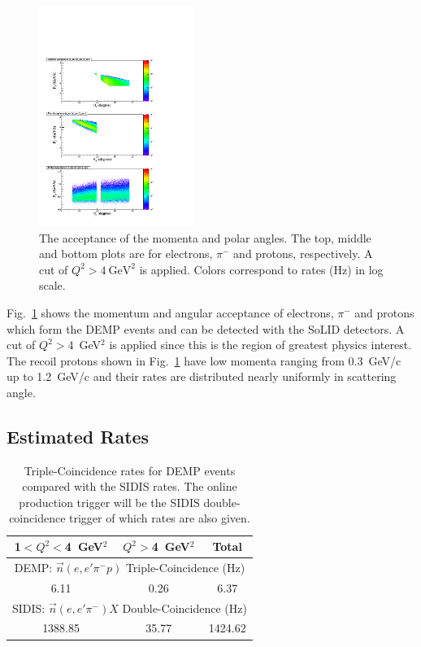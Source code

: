 \begin{figure}[!ht]
 \begin{center}
   \includegraphics[type=pdf,
     ext=.pdf,read=.pdf,width=0.45\textwidth]{./figures/E11_acc_epip_Q2gt4}
   \caption[The acceptance of the momenta and scattering angles for electrons,
    $\pi^{-}$ and protons]{\footnotesize{The acceptance of the momenta and
    polar angles. The top, middle and
    bottom plots are for electrons, $\pi^{-}$ and protons, respectively. A
    cut of $Q^{2}>4~\mathrm{GeV^{2}}$ is applied. Colors correspond to rates
    (Hz) in log scale.}}
  \label{p_theta}
  \end{center}
\end{figure}

Fig.~\ref{p_theta} shows the momentum and angular acceptance of electrons,
$\pi^{-}$ and protons which form the DEMP events and can be detected with the
SoLID detectors.  A cut of $Q^2>$4~GeV$^2$ is applied since this is the region of greatest physics interest.  The recoil
protons shown in Fig.~\ref{p_theta} have low momenta ranging from 0.3~GeV/c up
to 1.2~GeV/c and their rates are distributed nearly uniformly in scattering
angle.

\subsection{Estimated Rates}

\begin{table}[!ht]
\centering
\begin{tabular}{|c|c|c|}
 \hline
  1$<Q^2<$4~GeV$^2$ & $Q^2>$4~GeV$^2$ & Total\\
 \hline
\multicolumn{3}{|c|}{DEMP: $\vec{n}(e,e'\pi^{-}p)$ Triple-Coincidence (Hz)}\\
 \hline
 6.11   &  0.26 & 6.37   \\
 \hline
\multicolumn{3}{|c|}{SIDIS: $\vec{n}(e,e'\pi^{-})X$ Double-Coincidence (Hz)}\\
 \hline
        1388.85 & 35.77        & 1424.62   \\
 \hline
\end{tabular}
\caption[Triple-Coincidence rates for
  neutron-DEMP]{\footnotesize{Triple-Coincidence rates for DEMP events compared
    with the SIDIS rates.  The online production
    trigger will be the SIDIS double-coincidence trigger of which rates are
    also given.}}
\label{rate_table}
\end{table} 

